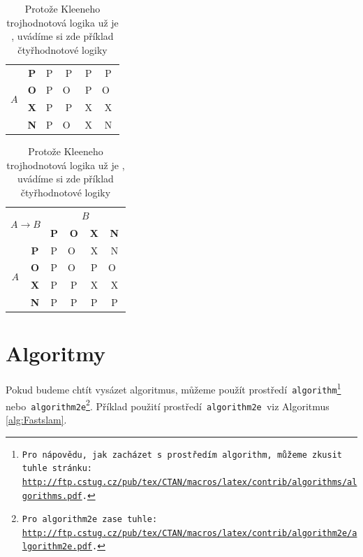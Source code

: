 \documentclass[11pt, a4paper]{article}
\begin{document}
\begin{table}[h]
\begin{tabular}{|c|c|c|c|c|c|}
        \hline 
        \multirow{4}{*}{$A$}
        & \textbf{P}  &  P & P & P & P  \\
        \cline{2-6} 
        & \textbf{O}  &  P & O~& P & O~\\
        \cline{2-6}
        & \textbf{X}  &  P & P & X & X  \\
        \cline{2-6}
        & \textbf{N}  &  P & O~& X & N  \\
      \hline 
    \end{tabular}
    \begin{tabular}{|c|c|c|c|c|c|}
        \hline 
        \multicolumn{2}{|c|}{\multirow{2}{*}{$A \rightarrow B$}} & \multicolumn{4}{c|}{$B$}\\
        \cline{3-6}
        \multicolumn{2}{|c|}{} & \textbf{P} & \textbf{O} & \textbf{X} & \textbf{N} \\ 
        \hline 
        \multirow{4}{*}{$A$}
        & \textbf{P}  &  P & O~& X & N  \\
        \cline{2-6} 
        & \textbf{O}  &  P & O~& P & O~\\
        \cline{2-6}
        & \textbf{X}  &  P & P & X & X  \\
        \cline{2-6}
        & \textbf{N}  &  P & P & P & P  \\
      \hline 
    \end{tabular}
\caption{Protože Kleeneho trojhodnotová logika už je , uvádíme si zde příklad čtyřhodnotové logiky}
\label{tab:Logika}
\end{table}

\bigskip
\pagebreak

\section{Algoritmy} \label{sec:algoritmy}
Pokud budeme chtít vysázet algoritmus, můžeme použít prostředí\texttt{ algorithm\footnote{Pro nápovědu, jak zacházet s~prostředím\texttt{ algorithm}, můžeme zkusit tuhle stránku:\\
\url{http://ftp.cstug.cz/pub/tex/CTAN/macros/latex/contrib/algorithms/algorithms.pdf}.} }nebo\texttt{ algorithm2e\footnote{Pro\texttt{ algorithm2e }zase tuhle:
\url{http://ftp.cstug.cz/pub/tex/CTAN/macros/latex/contrib/algorithm2e/algorithm2e.pdf}.}}.
Příklad použití prostředí\texttt{ algorithm2e }viz Algoritmus \ref{alg:Fastslam}.
\bigskip
\end{document}
